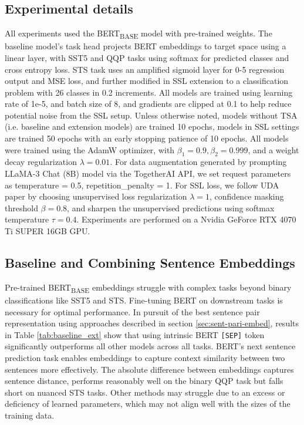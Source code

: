 \documentclass{article}
\begin{document}
\subsection{Experimental details}
All experiments used the BERT\textsubscript{BASE} model with pre-trained weights. The 
baseline model's task head projects BERT embeddings to target space using a linear layer, 
with SST5 and QQP tasks using softmax for predicted classes and cross entropy loss. STS 
task uses an amplified sigmoid layer for 0-5 regression output and MSE loss, and further
modified in SSL extension to a classification problem with 26 classes in 0.2 
increments. All models are trained using 
learning rate of 1e-5, and batch size of 8, and gradients are clipped at 0.1 to help
reduce potential noise from the SSL setup.
Unless otherwise noted,  models without TSA (i.e.
baseline and extension models) are trained 10 epochs, models in SSL settings are trained 50 epochs
with an early stopping patience of 10 epochs.
All models were trained using the AdamW optimizer, with $\beta_1 = 0.9, \beta_2 = 0.999$, 
and a weight decay regularization $\lambda = 0.01$.
For data augmentation generated by prompting LLaMA-3 Chat (8B) model via the TogetherAI API, 
we set request parameters as temperature = 0.5, repetition\_penalty = 1. 
For SSL loss, we follow UDA paper by choosing
unsupervised loss regularization $\lambda = 1$, confidence masking threshold $\beta = 0.8$,
and sharpen the unsupervised predictions using softmax temperature $\tau = 0.4$.
Experiments are performed on a Nvidia GeForce RTX 4070 Ti SUPER 16GB GPU.

\subsection{Baseline and Combining Sentence Embeddings}
\label{sec:baseline_ext}
Pre-trained BERT\textsubscript{BASE} embeddings struggle with complex tasks beyond binary 
classifications like SST5 and STS. Fine-tuning BERT on downstream tasks is necessary for 
optimal performance. In pursuit of the best sentence pair representation using approaches 
described in section \ref{sec:sent-pari-embed}, results in Table \ref{tab:baseline_ext} 
show that using intrinsic BERT \texttt{[SEP]} token significantly outperforms all other 
models across all tasks. BERT's next sentence prediction task enables embeddings to capture 
context similarity between two sentences more effectively. 
The absolute difference between embeddings captures 
sentence distance, performs reasonably well on the binary QQP task but falls short on 
nuanced STS tasks. 
Other methods may struggle due to an excess or deficiency of learned parameters, which may not 
align well with the sizes of the training data.
\end{document}
